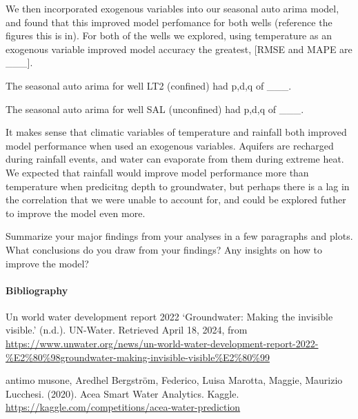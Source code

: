 \documentclass[
]{article}
\begin{document}
We then incorporated exogenous variables into our seasonal auto arima
model, and found that this improved model perfomance for both wells
(reference the figures this is in). For both of the wells we explored,
using temperature as an exogenous variable improved model accuracy the
greatest, {[}RMSE and MAPE are \_\_\_{]}.

The seasonal auto arima for well LT2 (confined) had p,d,q of \_\_\_.

The seasonal auto arima for well SAL (unconfined) had p,d,q of \_\_\_.

It makes sense that climatic variables of temperature and rainfall both
improved model performance when used an exogenous variables. Aquifers
are recharged during rainfall events, and water can evaporate from them
during extreme heat. We expected that rainfall would improve model
performance more than temperature when predicitng depth to groundwater,
but perhaps there is a lag in the correlation that we were unable to
account for, and could be explored futher to improve the model even
more.

Summarize your major findings from your analyses in a few paragraphs and
plots. What conclusions do you draw from your findings? Any insights on
how to improve the model?

\hypertarget{bibliography}{%
\paragraph{Bibliography}\label{bibliography}}

Un world water development report 2022 `Groundwater: Making the
invisible visible.' (n.d.). UN-Water. Retrieved April 18, 2024, from
\url{https://www.unwater.org/news/un-world-water-development-report-2022-\%E2\%80\%98groundwater-making-invisible-visible\%E2\%80\%99}

antimo musone, Aredhel Bergström, Federico, Luisa Marotta, Maggie,
Maurizio Lucchesi. (2020). Acea Smart Water Analytics. Kaggle.
\url{https://kaggle.com/competitions/acea-water-prediction}
\end{document}
